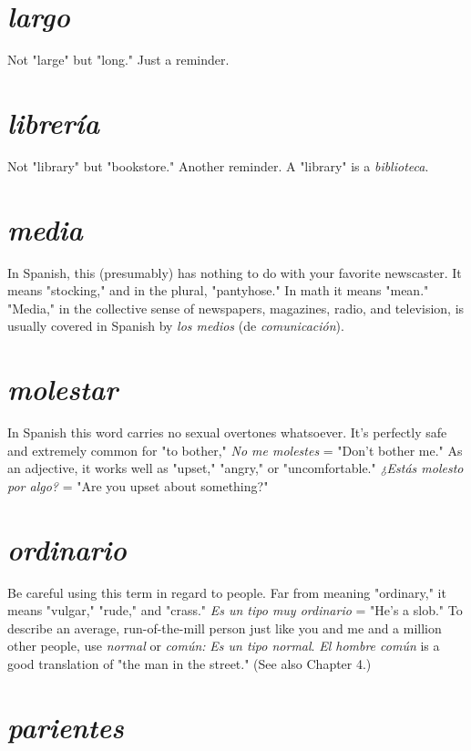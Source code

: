 \documentclass[14pt,a4paper,oneside]{memoir}
\begin{document}
\section{\emph{largo}}

Not "large" but "long." Just a reminder.

\section{\emph{librería}}

Not "library" but "bookstore." Another reminder.
A "library" is a \emph{biblioteca}.

\section{\emph{media}}

In Spanish, this (presumably) has nothing to do with
your favorite newscaster. It means "stocking," and in the plural,
"pantyhose." In math it means "mean." "Media," in the collective
sense of newspapers, magazines, radio, and television, is usually covered in Spanish by \emph{los medios} (de \emph{comunicación}).

\section{\emph{molestar}}

In Spanish this word carries no sexual overtones
whatsoever. It's perfectly safe and extremely common for "to bother,"
\emph{No me molestes} = "Don't bother me." As an adjective, it works well
as "upset," "angry," or "uncomfortable." \emph{¿Estás molesto por algo?} =
"Are you upset about something?"

\section{\emph{ordinario}}

Be careful using this term in regard to people.
Far from meaning "ordinary," it means "vulgar," "rude," and "crass."
\emph{Es un tipo muy ordinario} = "He's a slob." To describe an average, run-of-the-mill person just like you and me and a million other people, use
\emph{normal} or \emph{común:} \emph{Es un tipo normal}. \emph{El hombre común} is a good
translation of "the man in the street." (See also Chapter 4.)

\section{\emph{parientes}}
\end{document}
